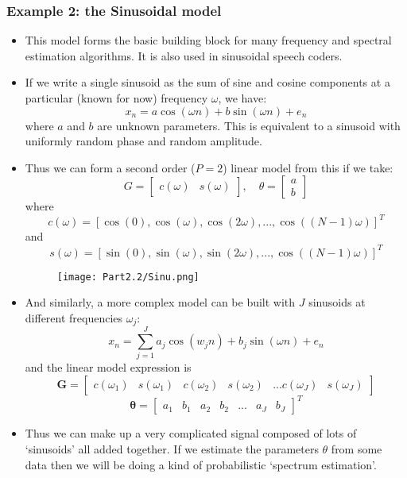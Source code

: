 \documentclass[12pt]{article}
\newcommand{\thetab}{\boldsymbol{\theta}}
\begin{document}
\subsubsection{Example 2: the Sinusoidal model}    
\begin{itemize}
    \item This model forms the basic building block for many frequency and spectral estimation algorithms. It is also used in sinusoidal speech coders.
    \item If we write a single sinusoid as the sum of sine and cosine components at a particular (known for now) frequency $\omega$, we have:
    \[
    x_n =a \cos(\omega n) + b \sin(\omega n) + e_n
    \]
    where $a$ and $b$ are unknown parameters. This is equivalent to a sinusoid with uniformly random phase and random amplitude.
    \item Thus we can form a second order ($P=2$) linear model from this if we take:
    \[
    G = \begin{bmatrix}
    c(\omega) & s(\omega)
    \end{bmatrix}, \quad \theta = \begin{bmatrix}
    a \\
    b
    \end{bmatrix}
    \]
    where 
    \[
    c(\omega) = [ \cos(0) , \cos(\omega), \cos(2\omega), ...,\cos((N-1)\omega)]^T
    \]
    and 
    \[
    s(\omega) = [\sin(0), \sin(\omega), \sin(2\omega),...,\cos((N-1)\omega)]^T
    \]
    \begin{figure}[H]
        \centering
        \texttt{[image: Part2.2/Sinu.png]}
    \end{figure}
    \item And similarly, a more complex model can be built with $J$ sinusoids at different frequencies $\omega_j$:
    \[
    x_n = \sum_{j=1}^J a_j \cos(w_j n) + b_j \sin(\omega n) + e_n
    \]
    and the linear model expression is
    \[
    \mathbf{G} = \begin{bmatrix}
    c(\omega_1) & s(\omega_1) & c(\omega_2) & s(\omega_2) & ... c(\omega_J) & s(\omega_J) 
    \end{bmatrix}
    \]
    \[
    \thetab = \begin{bmatrix}
    a_1 & b_1 & a_2 & b_2 & ... & a_J & b_J 
    \end{bmatrix}^T
    \]
    \item Thus we can make up a very complicated signal composed of lots of `sinusoids' all added together. If we estimate the parameters $\theta$ from some data then we will be doing a kind of probabilistic `spectrum estimation'.
\end{itemize}
\end{document}
